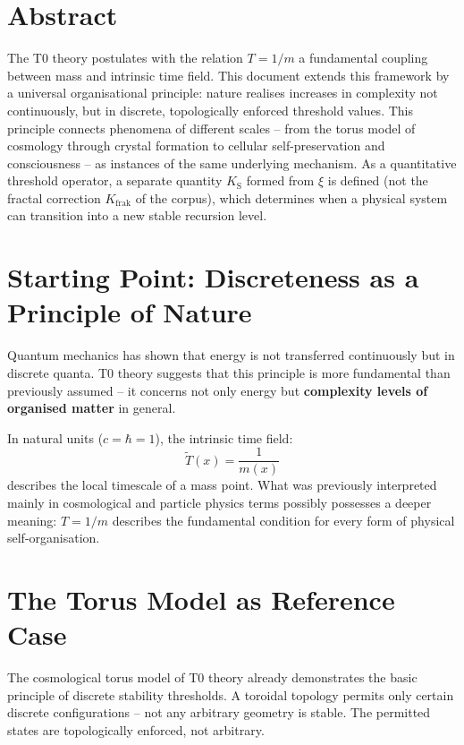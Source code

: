 
\section*{Abstract}

	The T0 theory postulates with the relation $T = 1/m$ a fundamental coupling between mass and intrinsic time field. This document extends this framework by a universal organisational principle: nature realises increases in complexity not continuously, but in discrete, topologically enforced threshold values. This principle connects phenomena of different scales -- from the torus model of cosmology through crystal formation to cellular self-preservation and consciousness -- as instances of the same underlying mechanism. As a quantitative threshold operator, a separate quantity $K_{\text{S}}$ formed from $\xi$ is defined (not the fractal correction $K_{\text{frak}}$ of the corpus), which determines when a physical system can transition into a new stable recursion level.

	
	\section{Starting Point: Discreteness as a Principle of Nature}
	
	Quantum mechanics has shown that energy is not transferred continuously but in discrete quanta. T0 theory suggests that this principle is more fundamental than previously assumed -- it concerns not only energy but \textbf{complexity levels of organised matter} in general.
	
	In natural units ($c = \hbar = 1$), the intrinsic time field:
	\begin{equation}
		\tilde{T}(x) = \frac{1}{m(x)}
	\end{equation}
	describes the local timescale of a mass point. What was previously interpreted mainly in cosmological and particle physics terms possibly possesses a deeper meaning: $T = 1/m$ describes the fundamental condition for every form of physical self-organisation.
	
	\section{The Torus Model as Reference Case}
	
	The cosmological torus model of T0 theory already demonstrates the basic principle of discrete stability thresholds. A toroidal topology permits only certain discrete configurations -- not any arbitrary geometry is stable. The permitted states are topologically enforced, not arbitrary.
	
